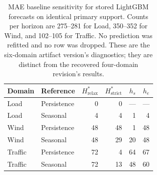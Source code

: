 \begin{table}[t]
\centering
\scriptsize
\setlength{\tabcolsep}{4pt}
\begin{tabular}{@{}llrrrr@{}}
\toprule
Domain & Reference & $H^*_{\mathrm{relax}}$ & $H^*_{\mathrm{strict}}$ & $h_s$ & $h_e$ \\
\midrule
Load & Persistence & 0 & 0 & --- & --- \\
Load & Seasonal & 4 & 4 & 1 & 4 \\
Wind & Persistence & 48 & 48 & 1 & 48 \\
Wind & Seasonal & 48 & 29 & 20 & 48 \\
Traffic & Persistence & 72 & 4 & 64 & 67 \\
Traffic & Seasonal & 72 & 13 & 48 & 60 \\
\bottomrule
\end{tabular}
\caption{MAE baseline sensitivity for stored LightGBM forecasts on identical
primary support. Counts per horizon are 275--281 for Load, 350--352 for Wind,
and 102--105 for Traffic. No prediction was refitted and no row was dropped.
These are the six-domain artifact version's diagnostics; they are distinct
from the recovered four-domain revision's results.}
\label{tab:revision-baseline}
\end{table}
